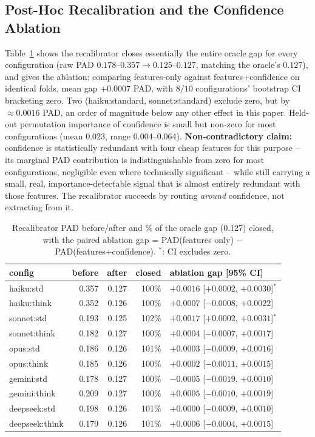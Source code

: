 \documentclass[letterpaper]{article} %
\begin{document}
\subsection{Post-Hoc Recalibration and the Confidence Ablation}
\label{sec:recal-results}
Table~\ref{tab:recal} shows the recalibrator closes essentially the entire
oracle gap for every configuration (raw PAD $0.178$--$0.357 \to
0.125$--$0.127$, matching the oracle's $0.127$), and gives the ablation:
comparing features-only against features$+$confidence on identical folds,
mean gap $+0.0007$ PAD, with $8/10$ configurations' bootstrap CI bracketing
zero. Two (haiku:standard, sonnet:standard) exclude zero, but by
$\approx0.0016$ PAD, an order of magnitude below any other effect in this
paper. Held-out permutation importance of confidence is small but non-zero
for most configurations (mean $0.023$, range $0.004$--$0.064$).
\textbf{Non-contradictory claim:} confidence is statistically redundant with
four cheap features for this purpose -- its marginal PAD contribution is
indistinguishable from zero for most configurations, negligible even where
technically significant -- while still carrying a small, real,
importance-detectable signal that is almost entirely redundant with those
features. The recalibrator succeeds by routing \emph{around} confidence, not
extracting from it.

\begin{table}[t]
\centering
\small
\setlength{\tabcolsep}{4pt}
\begin{tabular}{lrrrl}
\toprule
config & before & after & closed & ablation gap [95\% CI] \\
\midrule
haiku:std    & 0.357 & 0.127 & 100\% & $+0.0016$ [$+0.0002$, $+0.0030$]$^\ast$ \\
haiku:think  & 0.352 & 0.126 & 100\% & $+0.0007$ [$-0.0008$, $+0.0022$] \\
sonnet:std   & 0.193 & 0.125 & 102\% & $+0.0017$ [$+0.0002$, $+0.0031$]$^\ast$ \\
sonnet:think & 0.182 & 0.127 & 100\% & $+0.0004$ [$-0.0007$, $+0.0017$] \\
opus:std     & 0.186 & 0.126 & 101\% & $+0.0003$ [$-0.0009$, $+0.0016$] \\
opus:think   & 0.185 & 0.126 & 100\% & $+0.0002$ [$-0.0011$, $+0.0015$] \\
gemini:std   & 0.178 & 0.127 & 100\% & $-0.0005$ [$-0.0019$, $+0.0010$] \\
gemini:think & 0.209 & 0.127 & 100\% & $+0.0005$ [$-0.0010$, $+0.0019$] \\
deepseek:std & 0.198 & 0.126 & 101\% & $+0.0000$ [$-0.0009$, $+0.0010$] \\
deepseek:think & 0.179 & 0.126 & 101\% & $+0.0006$ [$-0.0004$, $+0.0015$] \\
\bottomrule
\end{tabular}
\caption{Recalibrator PAD before/after and \% of the oracle gap (0.127) closed, with the paired ablation gap = PAD(features only) $-$ PAD(features+confidence). $^\ast$: CI excludes zero.}
\label{tab:recal}
\end{table}
\end{document}
